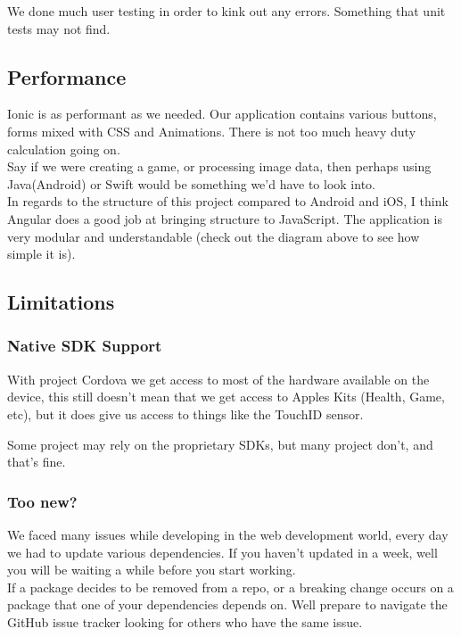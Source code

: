 We done much user testing in order to kink out any errors.
Something that unit tests may not find.

\subsection{Performance}
Ionic is as performant as we needed.
Our application contains various buttons, forms mixed with CSS and Animations.
There is not too much heavy duty calculation going on.
\\

Say if we were creating a game, or processing image data, then perhaps using Java(Android) or Swift would be something we'd have to look into.
\\

In regards to the structure of this project compared to Android and iOS, I think Angular does a good job at bringing structure to JavaScript.
The application is very modular and understandable (check out the diagram above to see how simple it is).

\subsection{Limitations}
\subsubsection{Native SDK Support}
With project Cordova we get access to most of the hardware available on the device, this still doesn't mean that we get access to Apples Kits (Health, Game, etc), but it does give us access to things like the TouchID sensor.

Some project may rely on the proprietary SDKs, but many project don't, and that's fine.

\subsubsection{Too new?}
We faced many issues while developing in the web development world, every day we had to update various dependencies.
If you haven't updated in a week, well you will be waiting a while before you start working.
\\

If a package decides to be removed from a repo, or a breaking change occurs on a package that one of your dependencies depends on.
Well prepare to navigate the GitHub issue tracker looking for others who have the same issue.
\\


